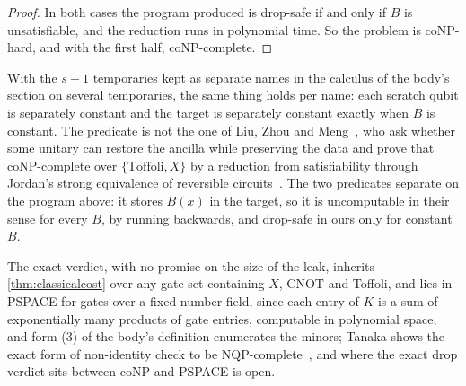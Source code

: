\documentclass[acmsmall,screen,review,anonymous,nonacm]{acmart}
\begin{document}
\begin{proof}
In both cases the program produced is drop-safe if and only if $B$ is
unsatisfiable, and the reduction runs in polynomial time. So the problem is
coNP-hard, and with the first half, coNP-complete.
\end{proof}

With the $s+1$ temporaries kept as separate names in the calculus of
the body's section on several temporaries, the same thing holds per name: each
scratch qubit is separately constant and the target is separately constant
exactly when $B$ is constant. The predicate is not the one of Liu, Zhou and
Meng~\cite{Liu2026Uncomputation}, who ask whether some unitary can restore the
ancilla while preserving the data and prove that coNP-complete over
$\{\mathrm{Toffoli}, X\}$ by a reduction from satisfiability through
Jordan's strong equivalence of reversible
circuits~\cite{Jordan2014StrongEquivalence}. The two predicates separate on
the program above: it stores $B(x)$ in the target, so it is uncomputable in
their sense for every $B$, by running backwards, and drop-safe in ours only
for constant $B$.

The exact verdict, with no promise on the size of the leak, inherits
\cref{thm:classicalcost} over any gate set containing $X$, CNOT and Toffoli,
and lies in PSPACE for gates over a fixed number field, since each entry of
$K$ is a sum of exponentially many products of gate entries, computable in
polynomial space, and form (3) of the body's definition enumerates the minors;
Tanaka shows the exact form of non-identity check to be
NQP-complete~\cite{Tanaka2009ExactNonIdentity}, and where the exact drop
verdict sits between coNP and PSPACE is open.
\end{document}
